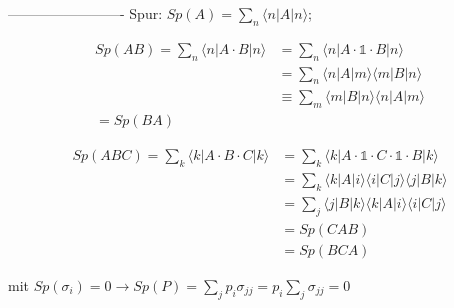 -------------------------
Spur: \(Sp(A) = \sum_n \langle n |A|n\rangle\); 

\begin{align}
Sp(AB) = \sum_n \langle n |A\cdot B|n\rangle &= \sum_n \langle n |A\cdot \mathbb 1 \cdot B|n\rangle \\
&= \sum_n \langle n |A|m\rangle \langle m |B|n\rangle \\
&\equiv \sum_m \langle m |B|n\rangle \langle n |A|m\rangle \\
= Sp(BA)
\end{align}

\begin{align}
Sp(ABC) = \sum_k \langle k |A\cdot B\cdot C|k\rangle &= \sum_k \langle k |A\cdot \mathbb 1\cdot C\cdot \mathbb 1 \cdot B|k\rangle \\
&= \sum_k \langle k |A| i\rangle \langle i|C| j\rangle \langle j |B|k\rangle \\
&= \sum_j \langle j |B|k\rangle \langle k |A| i\rangle \langle i|C| j\rangle \\
&= Sp(CAB)\\
&= Sp(BCA)
\end{align}



mit \(Sp(\sigma_i)=0 \rightarrow Sp(P)=\sum_jp_i\sigma_{jj}=p_i\sum_j\sigma_{jj}=0\)





